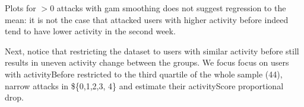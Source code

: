 \documentclass[10pt,]{scrartcl}
\newenvironment{Shaded}{\begin{snugshade}}{\end{snugshade}}
\newcommand{\KeywordTok}[1]{\textcolor[rgb]{0.13,0.29,0.53}{\textbf{#1}}}
\newcommand{\DecValTok}[1]{\textcolor[rgb]{0.00,0.00,0.81}{#1}}
\newcommand{\StringTok}[1]{\textcolor[rgb]{0.31,0.60,0.02}{#1}}
\newcommand{\OperatorTok}[1]{\textcolor[rgb]{0.81,0.36,0.00}{\textbf{#1}}}
\newcommand{\NormalTok}[1]{#1}
\begin{document}
Plots for \(>0\) attacks with gam smoothing does not suggest regression
to the mean: it is not the case that attacked users with higher activity
before indeed tend to have lower activity in the second week.

Next, notice that restricting the dataset to users with similar activity
before still results in uneven activity change between the groups. We
focus focus on users with \textsf{activityBefore} restricted to the
third quartile of the whole sample (44), narrow attacks in \$\{0,1,2,3,
4\} and estimate their \textsf{activityScore} proportional drop.

\footnotesize

\begin{Shaded}
\end{Shaded}
\end{document}
